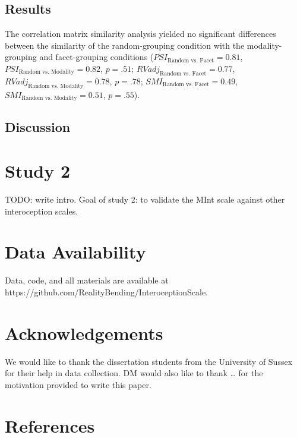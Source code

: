 \documentclass[
  jou,
  floatsintext,
  longtable,
  nolmodern,
  notxfonts,
  notimes,
  colorlinks=true,linkcolor=blue,citecolor=blue,urlcolor=blue]{apa7}
\begin{document}
\subsection{Results}\label{results}

The correlation matrix similarity analysis yielded no significant
differences between the similarity of the random-grouping condition with
the modality-grouping and facet-grouping conditions
(\(PSI_{\text{Random vs. Facet}} = 0.81\),
\(PSI_{\text{Random vs. Modality}} = 0.82\), \(p = .51\);
\(RVadj_{\text{Random vs. Facet}} = 0.77\),
\(RVadj_{\text{Random vs. Modality}} = 0.78\), \(p = .78\);
\(SMI_{\text{Random vs. Facet}} = 0.49\),
\(SMI_{\text{Random vs. Modality}} = 0.51\), \(p = .55\)).

\subsection{Discussion}\label{discussion}

\section{Study 2}\label{study-2}

TODO: write intro. Goal of study 2: to validate the MInt scale against
other interoception scales.

\section{Data Availability}\label{data-availability}

Data, code, and all materials are available at
https://github.com/RealityBending/InteroceptionScale.

\section{Acknowledgements}\label{acknowledgements}

We would like to thank the dissertation students from the University of
Sussex for their help in data collection. DM would also like to thank
\ldots{} for the motivation provided to write this paper.

\section{References}\label{references}
\end{document}
